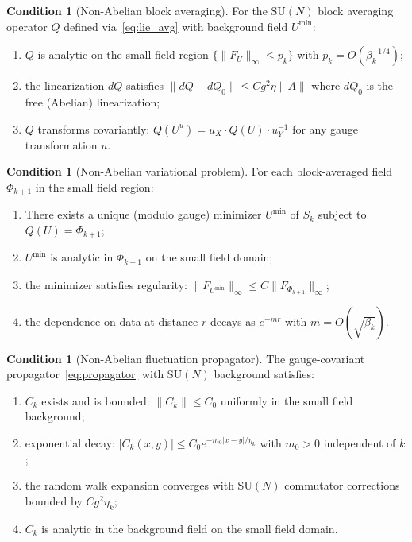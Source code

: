 \documentclass[11pt,a4paper]{article}
\theoremstyle{plain}
\theoremstyle{definition}
\newtheorem{condition}[theorem]{Condition}
\theoremstyle{remark}
\newcommand{\SU}{\mathrm{SU}}
\begin{document}
\begin{condition}[Non-Abelian block averaging]
\label{cond:avg}
For the $\SU(N)$ block averaging operator
$Q$ defined via~\eqref{eq:lie_avg} with background
field $U^{\min}$:
\begin{enumerate}[label=(\alph*),nosep]
  \item $Q$ is analytic on the small field region
    $\{\|F_U\|_\infty \le p_k\}$ with
    $p_k = O(\beta_k^{-1/4})$;
  \item the linearization $dQ$ satisfies
    $\|dQ - dQ_0\| \le C g^2 \eta \|A\|$ where
    $dQ_0$ is the free (Abelian) linearization;
  \item $Q$ transforms covariantly:
    $Q(U^u) = u_X \cdot Q(U) \cdot u_Y^{-1}$
    for any gauge transformation $u$.
\end{enumerate}
\end{condition}

\begin{condition}[Non-Abelian variational problem]
\label{cond:var}
For each block-averaged field $\Phi_{k+1}$ in the
small field region:
\begin{enumerate}[label=(\alph*),nosep]
  \item There exists a unique (modulo gauge) minimizer
    $U^{\min}$ of $S_k$ subject to $Q(U) = \Phi_{k+1}$;
  \item $U^{\min}$ is analytic in $\Phi_{k+1}$
    on the small field domain;
  \item the minimizer satisfies regularity:
    $\|F_{U^{\min}}\|_\infty \le C \|F_{\Phi_{k+1}}\|_\infty$;
  \item the dependence on data at distance $r$
    decays as $e^{-mr}$ with $m = O(\sqrt{\beta_k})$.
\end{enumerate}
\end{condition}

\begin{condition}[Non-Abelian fluctuation propagator]
\label{cond:prop}
The gauge-covariant propagator~\eqref{eq:propagator}
with $\SU(N)$ background satisfies:
\begin{enumerate}[label=(\alph*),nosep]
  \item $C_k$ exists and is bounded:
    $\|C_k\| \le C_0$ uniformly in the small field
    background;
  \item exponential decay: $|C_k(x,y)| \le C_0
    e^{-m_0 |x-y|/\eta_k}$ with $m_0 > 0$
    independent of $k$;
  \item the random walk expansion converges
    with $\SU(N)$ commutator corrections
    bounded by $C g^2 \eta_k$;
  \item $C_k$ is analytic in the background field
    on the small field domain.
\end{enumerate}
\end{condition}
\end{document}
